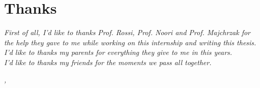 \documentclass[../thesis.tex]{subfiles}
\begin{document}
    \cleardoublepage

    \bigskip

    \begingroup
    \let\clearpage\relax
    \let\cleardoublepage\relax
    \let\cleardoublepage\relax

    \chapter*{Thanks}
    \noindent \textit{First of all, I'd like to thanks Prof. Rossi, Prof. Noori and Prof. Majchrzak for the help they gave to me while working on this internship and writing this thesis.}\\

    \noindent \textit{I'd like to thanks my parents for everything they give to me in this years.}\\

    \noindent \textit{I'd like to thanks my friends for the moments we pass all together.}\\
    \bigskip

    \noindent\textit{\myLocation, \myTime}
    \hfill \myName

    \endgroup
\end{document}
